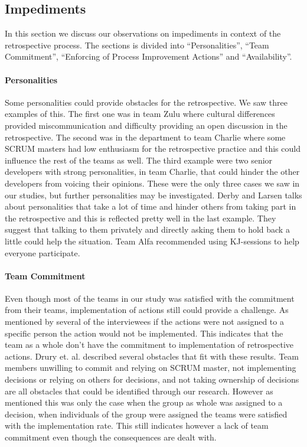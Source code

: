 \subsection{Impediments}
In this section we discuss our observations on impediments in context of the retrospective process. The sections is divided into ``Personalities'', ``Team Commitment'', ``Enforcing of Process Improvement Actions'' and ``Availability''.

\paragraph{Personalities}
Some personalities could provide obstacles for the retrospective. We saw three examples of this. The first one was in team Zulu where cultural differences provided miscommunication and difficulty providing an open discussion in the retrospective. The second was in the department to team Charlie where some SCRUM masters had low enthusiasm for the retrospective practice and this could influence the rest of the teams as well. The third example were two senior developers with strong personalities, in team Charlie, that could hinder the other developers from voicing their opinions. These were the only three cases we saw in our studies, but further personalities may be investigated. Derby and Larsen \cite{Larsen2006} talks about personalities that take a lot of time and hinder others from taking part in the retrospective and this is reflected pretty well in the last example. They suggest that talking to them privately and directly asking them to hold back a little could help the situation. Team Alfa recommended using KJ-sessions to help everyone participate.

\paragraph{Team Commitment}
\label{team-commi}
Even though most of the teams in our study was satisfied with the commitment from their teams, implementation of actions still could provide a challenge. As mentioned by several of the interviewees if the actions were not assigned to a specific person the action would not be implemented. This indicates that the team as a whole don't have the commitment to implementation of retrospective actions. Drury et. al. \cite{Drury2012} described several obstacles that fit with these results. Team members unwilling to commit and relying on SCRUM master, not implementing decisions or relying on others for decisions, and not taking ownership of decisions are all obstacles that could be identified through our research. However as mentioned this was only the case when the group as whole was assigned to a decision, when individuals of the group were assigned the teams were satisfied with the implementation rate. This still indicates however a lack of team commitment even though the consequences are dealt with. 

